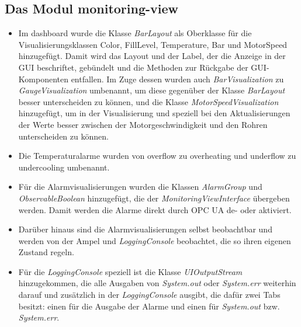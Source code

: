 \documentclass[parskip=full]{scrartcl}
\begin{document}
\subsection{Das Modul monitoring-view}
\begin{itemize}
 \item Im dashboard wurde die Klasse \emph{BarLayout} als Oberklasse für die Visualisierungsklassen Color, FillLevel, Temperature, Bar und MotorSpeed hinzugefügt. Damit wird das Layout und der Label, der die Anzeige in der GUI beschriftet, gebündelt und die Methoden zur Rückgabe der GUI-Komponenten entfallen. Im Zuge dessen wurden auch \emph{BarVisualization} zu \emph{GaugeVisualization} umbenannt, um diese gegenüber der Klasse \emph{BarLayout} besser unterscheiden zu können, und die Klasse \emph{MotorSpeedVisualization} hinzugefügt, um in der Visualisierung und speziell bei den Aktualisierungen der Werte besser zwischen der Motorgeschwindigkeit und den Rohren unterscheiden zu können.
 \item Die Temperaturalarme wurden von overflow zu overheating und underflow zu undercooling umbenannt.
 \item Für die Alarmvisualisierungen wurden die Klassen \emph{AlarmGroup} und \emph{ObservableBoolean} hinzugefügt, die der \emph{MonitoringViewInterface} übergeben werden. Damit werden die Alarme direkt durch OPC UA de- oder aktiviert.
 \item Darüber hinaus sind die Alarmvisualisierungen selbst beobachtbar und werden von der Ampel und \emph{LoggingConsole} beobachtet, die so ihren eigenen Zustand regeln.
 \item Für die \emph{LoggingConsole} speziell ist die Klasse \emph{UIOutputStream} hinzugekommen, die alle Ausgaben von \emph{System.out} oder \emph{System.err} weiterhin darauf und zusätzlich in der \emph{LoggingConsole} ausgibt, die dafür zwei Tabs besitzt: einen für die Ausgabe der Alarme und einen für \emph{System.out} bzw. \emph{System.err}.
\end{itemize}
\end{document}
